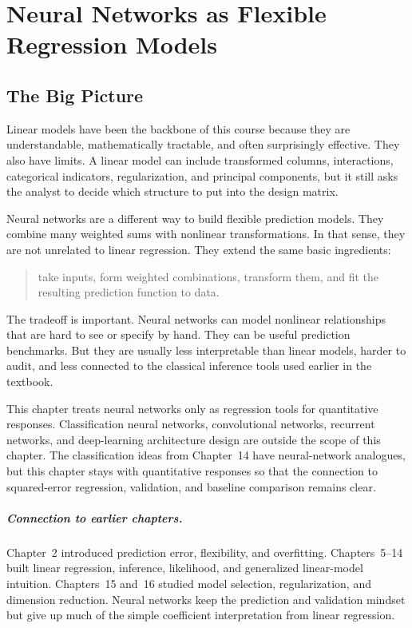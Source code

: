 \chapter[Neural Networks as Flexible Regression Models]{Neural Networks as Flexible Regression Models}
\label{chap:neural-networks-flexible-regression-models}

\section{The Big Picture}

Linear models have been the backbone of this course because they are understandable, mathematically tractable, and often surprisingly effective.  They also have limits.  A linear model can include transformed columns, interactions, categorical indicators, regularization, and principal components, but it still asks the analyst to decide which structure to put into the design matrix.

Neural networks are a different way to build flexible prediction models.  They combine many weighted sums with nonlinear transformations.  In that sense, they are not unrelated to linear regression.  They extend the same basic ingredients:
\begin{quote}
  take inputs, form weighted combinations, transform them, and fit the resulting prediction function to data.
\end{quote}

The tradeoff is important.  Neural networks can model nonlinear relationships that are hard to see or specify by hand.  They can be useful prediction benchmarks.  But they are usually less interpretable than linear models, harder to audit, and less connected to the classical inference tools used earlier in the textbook.

This chapter treats neural networks only as regression tools for quantitative responses.  Classification neural networks, convolutional networks, recurrent networks, and deep-learning architecture design are outside the scope of this chapter.  The classification ideas from Chapter~14 have neural-network analogues, but this chapter stays with quantitative responses so that the connection to squared-error regression, validation, and baseline comparison remains clear.

\paragraph{Connection to earlier chapters.}
Chapter~2 introduced prediction error, flexibility, and overfitting.  Chapters~5--14 built linear regression, inference, likelihood, and generalized linear-model intuition.  Chapters~15 and~16 studied model selection, regularization, and dimension reduction.  Neural networks keep the prediction and validation mindset but give up much of the simple coefficient interpretation from linear regression.

